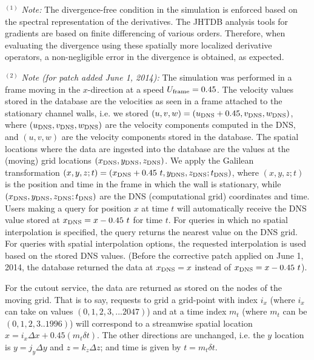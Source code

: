 \documentclass[11pt,letterpaper]{article}
\begin{document}
\vspace{0.4 cm}
\noindent $^{(1)}$ {\it Note:} The divergence-free condition in the simulation is enforced based on the spectral representation of the derivatives.
The JHTDB analysis tools for gradients are based on finite differencing of various orders. Therefore, when evaluating the divergence using these spatially more localized derivative operators, a non-negligible error in the divergence is obtained, as expected.  
 
 \vspace{0.4 cm}
\noindent $^{(2)}$ {\it Note (for patch added June 1, 2014):}   The simulation was performed in a frame moving in the $x$-direction at a speed $U_{\rm frame} = 0.45$. The velocity 
values stored in the database are the velocities as seen in a frame attached to the stationary channel walls, i.e. we stored $(u,v,w)=(u_{\rm DNS}+0.45,v_{\rm DNS},w_{\rm DNS})$, where $(u_{\rm DNS},v_{\rm DNS},w_{\rm DNS})$ are the velocity components computed in the DNS, and $(u,v,w)$ are the velocity components stored in the database.  The spatial locations where the data are ingested into the database are the values at the (moving) grid locations  $(x_{\rm DNS},y_{\rm DNS},z_{\rm DNS})$.  We apply the Galilean transformation $(x,y,z;t) = (x_{\rm DNS}+0.45~ t,y_{\rm DNS},z_{\rm DNS};t_{\rm DNS})$, where $(x,y,z;t)$ is the position and time in the frame in which the wall is stationary, while $(x_{\rm DNS},y_{\rm DNS},z_{\rm DNS};t_{\rm DNS})$ are the DNS (computational grid) coordinates and time. Users making a query  for position $x$ at time $t$ will automatically receive the DNS value stored at $x_{\rm DNS} = x-0.45~ t$ for time $t$. For queries in which no spatial interpolation is specified, the query returns the nearest value on the DNS grid. For queries with spatial interpolation options, the requested interpolation is used based on the stored DNS values. (Before the corrective patch applied on June 1, 2014, the database returned the data at $x_{\rm DNS} = x $ instead of $x_{\rm DNS} = x-0.45~ t$). 

For the cutout service, the data are returned as stored on the nodes of the moving grid. That is to say, requests to grid a grid-point with index $i_x$ (where $i_x$ can take on values $(0,1,2,3,...2047)$) and at a time index $m_t$ (where $m_t$ can be $(0,1,2,3..1996)$) will correspond to a streamwise spatial location $x = i_x \Delta x + 0.45 (m_t \delta t)$. The other directions are unchanged, i.e. the $y$ location is $y=j_y \Delta y$ and $z=k_z \Delta z$; and time is given by $t = m_t \delta t$. 
\end{document}
